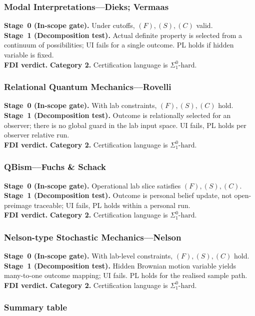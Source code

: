 \documentclass[12pt]{article}
\theoremstyle{definition}
\theoremstyle{plain}
\begin{document}
\subsubsection{Modal Interpretations––Dieks; Vermaas}
\textbf{Stage~0 (In-scope gate).} Under cutoffs, \((F),(S),(C)\) valid.\\
\textbf{Stage~1 (Decomposition test).} Actual definite property is selected from a continuum of possibilities; UI fails for a single outcome. PL holds if hidden variable is fixed.\\
\textbf{FDI verdict.} \textbf{Category 2.} Certification language is \(\Sigma^0_1\text{-hard}\).  
\subsubsection{Relational Quantum Mechanics––Rovelli}
\textbf{Stage~0 (In-scope gate).} With lab constraints, \((F),(S),(C)\) hold.\\
\textbf{Stage~1 (Decomposition test).} Outcome is relationally selected for an observer; there is no global guard in the lab input space. UI fails, PL holds per observer relative run.\\
\textbf{FDI verdict.} \textbf{Category 2.} Certification language is \(\Sigma^0_1\text{-hard}\).  
\subsubsection{QBism––Fuchs \& Schack}
\textbf{Stage~0 (In-scope gate).} Operational lab slice satisfies \((F),(S),(C)\).\\
\textbf{Stage~1 (Decomposition test).} Outcome is personal belief update, not open-preimage traceable; UI fails, PL holds within a personal run.\\
\textbf{FDI verdict.} \textbf{Category 2.} Certification language is \(\Sigma^0_1\text{-hard}\).  
\subsubsection{Nelson-type Stochastic Mechanics––Nelson}
\textbf{Stage~0 (In-scope gate).} With lab-level constraints, \((F),(S),(C)\) hold.\\
\textbf{Stage~1 (Decomposition test).} Hidden Brownian motion variable yields many-to-one outcome mapping; UI fails. PL holds for the realised sample path.\\
\textbf{FDI verdict.} \textbf{Category 2.} Certification language is \(\Sigma^0_1\text{-hard}\).  
\subsubsection{Summary table}
\end{document}
